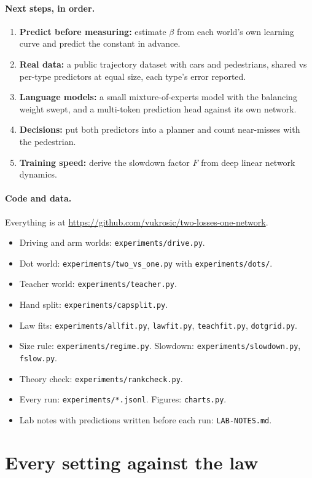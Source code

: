 \documentclass[11pt]{article}
\newcommand{\para}[1]{\paragraph{#1}}
\begin{document}
\para{Next steps, in order.}
\begin{enumerate}
\item \textbf{Predict before measuring:} estimate $\beta$ from each world's own learning curve and predict the constant in advance.
\item \textbf{Real data:} a public trajectory dataset with cars and pedestrians, shared vs per-type predictors at equal size, each type's error reported.
\item \textbf{Language models:} a small mixture-of-experts model with the balancing weight swept, and a multi-token prediction head against its own network.
\item \textbf{Decisions:} put both predictors into a planner and count near-misses with the pedestrian.
\item \textbf{Training speed:} derive the slowdown factor $F$ from deep linear network dynamics.
\end{enumerate}

\para{Code and data.} Everything is at \url{https://github.com/vukrosic/two-losses-one-network}.
\begin{itemize}
\item Driving and arm worlds: \texttt{experiments/drive.py}.
\item Dot world: \texttt{experiments/two\_vs\_one.py} with \texttt{experiments/dots/}.
\item Teacher world: \texttt{experiments/teacher.py}.
\item Hand split: \texttt{experiments/capsplit.py}.
\item Law fits: \texttt{experiments/allfit.py}, \texttt{lawfit.py}, \texttt{teachfit.py}, \texttt{dotgrid.py}.
\item Size rule: \texttt{experiments/regime.py}. Slowdown: \texttt{experiments/slowdown.py}, \texttt{fslow.py}.
\item Theory check: \texttt{experiments/rankcheck.py}.
\item Every run: \texttt{experiments/*.jsonl}. Figures: \texttt{charts.py}.
\item Lab notes with predictions written before each run: \texttt{LAB-NOTES.md}.
\end{itemize}




\appendix

\section{Every setting against the law}
\label{app:settings}
\end{document}
